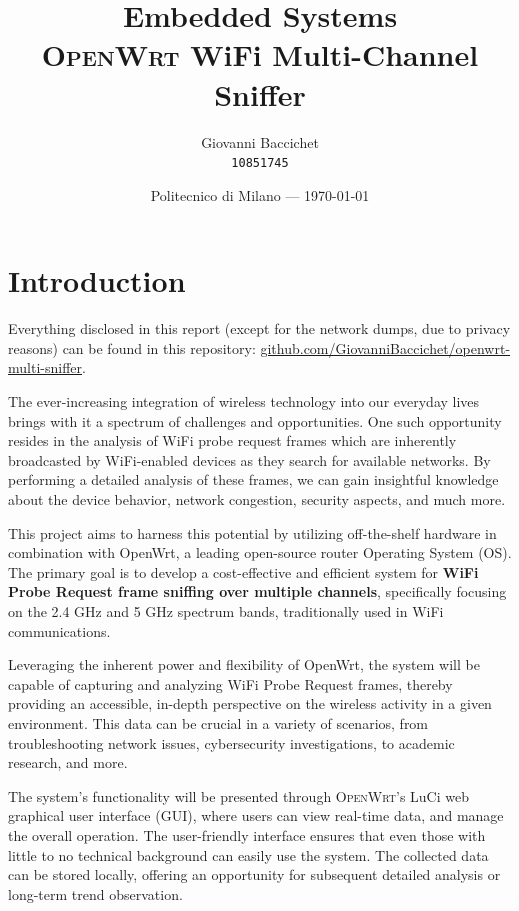 \documentclass{article}
\title{Embedded Systems \\ \textsc{OpenWrt} WiFi Multi-Channel Sniffer} %
\author{Giovanni Baccichet \\ \raisebox{0.1\height}{\fontsize{8}{8}\faUser} \texttt{10851745}} %
\date{Politecnico di Milano --- \today} %
\begin{document}
\maketitle %


\section{Introduction} %

\begin{warn}
    Everything disclosed in this report (except for the network dumps, due to privacy reasons) can be found in this repository: \href{https://github.com/GiovanniBaccichet/openwrt-multi-sniffer}{\raisebox{0.1\height}{\fontsize{8}{8}\faLink} github.com/GiovanniBaccichet/openwrt-multi-sniffer}.
\end{warn}

The ever-increasing integration of wireless technology into our everyday lives brings with it a spectrum of challenges and opportunities. One such opportunity resides in the analysis of WiFi probe request frames which are inherently broadcasted by WiFi-enabled devices as they search for available networks. By performing a detailed analysis of these frames, we can gain insightful knowledge about the device behavior, network congestion, security aspects, and much more.

This project aims to harness this potential by utilizing off-the-shelf hardware in combination with OpenWrt, a leading open-source router Operating System (OS). The primary goal is to develop a cost-effective and efficient system for \textbf{WiFi Probe Request frame sniffing over multiple channels}, specifically focusing on the 2.4 GHz and 5 GHz spectrum bands, traditionally used in WiFi communications. 

Leveraging the inherent power and flexibility of OpenWrt, the system will be capable of capturing and analyzing WiFi Probe Request frames, thereby providing an accessible, in-depth perspective on the wireless activity in a given environment. This data can be crucial in a variety of scenarios, from troubleshooting network issues, cybersecurity investigations, to academic research, and more.

The system's functionality will be presented through \textsc{OpenWrt}'s LuCi web graphical user interface (GUI), where users can view real-time data, and manage the overall operation. The user-friendly interface ensures that even those with little to no technical background can easily use the system. The collected data can be stored locally, offering an opportunity for subsequent detailed analysis or long-term trend observation.
\end{document}
